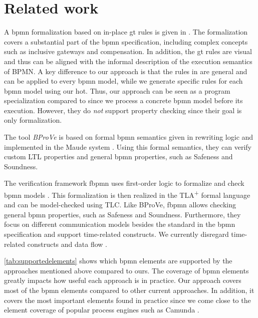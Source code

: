 \documentclass[runningheads]{llncs}
\begin{document}
\section{Related work} \label{sec:relatedWork}
A \gls*{bpmn} formalization based on in-place \gls*{gt} rules is given in \cite{vangorpVisualTokenbasedFormalization2013}.
The formalization covers a substantial part of the \gls*{bpmn} specification, including complex concepts such as inclusive gateways and compensation.
In addition, the \gls*{gt} rules are visual and thus can be aligned with the informal description of the execution semantics of BPMN.
A key difference to our approach is that the rules in \cite{vangorpVisualTokenbasedFormalization2013} are general and can be applied to every \gls*{bpmn} model, while we generate specific rules for each \gls*{bpmn} model using our \gls*{hot}.
Thus, our approach can be seen as a program specialization compared to \cite{vangorpVisualTokenbasedFormalization2013} since we process a concrete \gls*{bpmn} model before its execution.
However, they do \textit{not} support property checking since their goal is only formalization.

The tool \textit{BProVe} is based on formal \gls*{bpmn} semantics given in rewriting logic and implemented in the Maude system \cite{corradiniFormalApproachAnalysis2021}.
Using this formal semantics, they can verify custom LTL properties and general \gls*{bpmn} properties, such as Safeness and Soundness.

The verification framework \textsf{fbpmn} uses first-order logic to formalize and check \gls*{bpmn} models \cite{houhouFirstOrderLogicVerification2022}.
This formalization is then realized in the TLA\textsuperscript{+} formal language and can be model-checked using TLC.
Like BProVe, \textsf{fbpmn} allows checking general \gls*{bpmn} properties, such as Safeness and Soundness.
Furthermore, they focus on different communication models besides the standard in the \gls*{bpmn} specification and support time-related constructs.
We currently disregard time-related constructs \cite{duranVerifyingTimedBPMN2017,houhouFirstOrderLogicVerification2022} and data flow \cite{corradiniFormalisingAnimatingMultiple2022,el-saberCMMICMComplianceChecking2015}.

\autoref{tab:supportedelements} shows which \gls*{bpmn} elements are supported by the approaches mentioned above compared to ours.
The coverage of \gls*{bpmn} elements greatly impacts how useful each approach is in practice.
Our approach covers most of the \gls*{bpmn} elements compared to other current approaches.
In addition, it covers the most important elements found in practice since we come close to the element coverage of popular process engines such as Camunda \cite{camundaservicesgmbhBPMNImplementationReference2023}.
\end{document}

